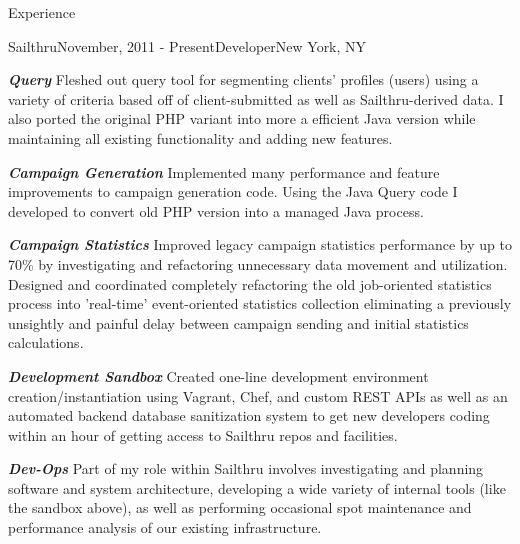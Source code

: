 \documentclass{resume} %
\begin{document}
\begin{rSection}{Experience}

\begin{rSubsection}{Sailthru}{November, 2011 - Present}{Developer}{New York, NY}
\item \textbf{\textit{Query}} Fleshed out query tool for segmenting clients' profiles (users) using a variety of criteria based off of client-submitted as well as Sailthru-derived data. I also ported the original PHP variant into more a efficient Java version while maintaining all existing functionality and adding new features.
\item \textbf{\textit{Campaign Generation}} Implemented many performance and feature improvements to campaign generation code.  Using the Java Query code I developed to convert old PHP version into a managed Java process.
\item \textbf{\textit{Campaign Statistics}} Improved legacy campaign statistics performance by up to 70\% by investigating and refactoring unnecessary data movement and utilization. Designed and coordinated completely refactoring the old job-oriented statistics process into 'real-time' event-oriented statistics collection eliminating a previously unsightly and painful delay between campaign sending and initial statistics calculations.
\item \textbf{\textit{Development Sandbox}} Created one-line development environment creation/instantiation using Vagrant, Chef, and custom REST APIs as well as an automated backend database sanitization system to get new developers coding within an hour of getting access to Sailthru repos and facilities.
\item \textbf{\textit{Dev-Ops}} Part of my role within Sailthru involves investigating and planning software and system architecture, developing a wide variety of internal tools (like the sandbox above), as well as performing occasional spot maintenance and performance analysis of our existing infrastructure.
\end{rSubsection}



\end{rSection}
\end{document}
